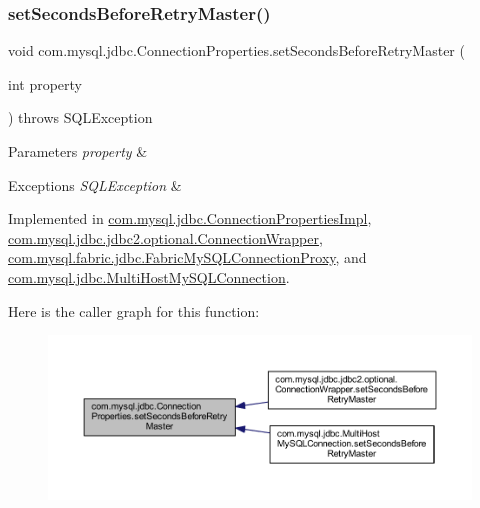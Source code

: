 \subsubsection{\texorpdfstring{set\+Seconds\+Before\+Retry\+Master()}{setSecondsBeforeRetryMaster()}}
{\footnotesize\ttfamily void com.\+mysql.\+jdbc.\+Connection\+Properties.\+set\+Seconds\+Before\+Retry\+Master (\begin{DoxyParamCaption}\item[{int}]{property }\end{DoxyParamCaption}) throws S\+Q\+L\+Exception}


\begin{DoxyParams}{Parameters}
{\em property} & \\
\hline
\end{DoxyParams}

\begin{DoxyExceptions}{Exceptions}
{\em S\+Q\+L\+Exception} & \\
\hline
\end{DoxyExceptions}


Implemented in \mbox{\hyperlink{classcom_1_1mysql_1_1jdbc_1_1_connection_properties_impl_a9d8785362f5a7c1519ab5f3dd67bc8f3}{com.\+mysql.\+jdbc.\+Connection\+Properties\+Impl}}, \mbox{\hyperlink{classcom_1_1mysql_1_1jdbc_1_1jdbc2_1_1optional_1_1_connection_wrapper_af7f390ffe3cd2dea5f5192e52147be89}{com.\+mysql.\+jdbc.\+jdbc2.\+optional.\+Connection\+Wrapper}}, \mbox{\hyperlink{classcom_1_1mysql_1_1fabric_1_1jdbc_1_1_fabric_my_s_q_l_connection_proxy_a4928a26b6dcb61299e8070a99822d914}{com.\+mysql.\+fabric.\+jdbc.\+Fabric\+My\+S\+Q\+L\+Connection\+Proxy}}, and \mbox{\hyperlink{classcom_1_1mysql_1_1jdbc_1_1_multi_host_my_s_q_l_connection_a7604c2e4bfbbb42ec5ce170e86970ef3}{com.\+mysql.\+jdbc.\+Multi\+Host\+My\+S\+Q\+L\+Connection}}.

Here is the caller graph for this function\+:\nopagebreak
\begin{figure}[H]
\begin{center}
\leavevmode
\includegraphics[width=350pt]{interfacecom_1_1mysql_1_1jdbc_1_1_connection_properties_aebbbaaab658a9df1fd2af21e9c3ccbf5_icgraph}
\end{center}
\end{figure}
\mbox{\label{interfacecom_1_1mysql_1_1jdbc_1_1_connection_properties_a696230dd8e57568c8742fffecb1040aa}} 
